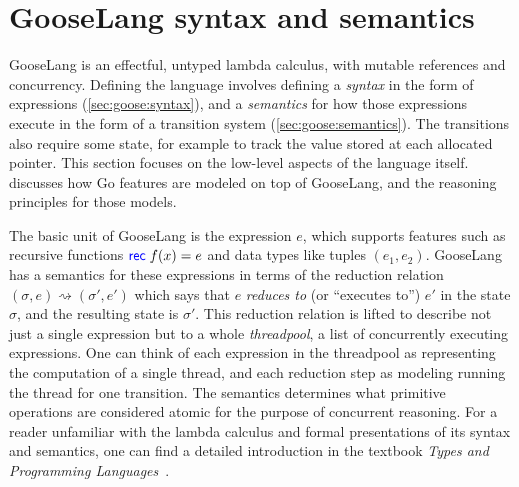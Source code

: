 \section{GooseLang syntax and semantics}%
\label{sec:goose:lang}

\newcommand{\binop}{\circledcirc}
\newcommand{\unop}{\circleddash}

\newcommand{\external}{\mathsf{\textcolor{red}{\langle External \rangle}}}

\newcommand{\recfx}{\mbox{\goosekw{rec}\;$f(x) = e$}}
\newcommand{\gooselambda}[1]{\goosekw{\lambda}#1.\,}

\newcommand{\reduces}{\rightsquigarrow}
\newcommand{\purereduction}{\overset{\mathrm{pure}}{\reduces}}

\newcommand{\nareading}[2]{\mathsf{reading}(#1, #2)}
\newcommand{\nawriting}[1]{\mathsf{writing}(#1)}

GooseLang is an effectful, untyped lambda calculus, with mutable references and
concurrency. Defining the language involves defining a \emph{syntax} in the form
of expressions (\cref{sec:goose:syntax}), and a \emph{semantics} for how those expressions execute in the
form of a transition system (\cref{sec:goose:semantics}). The transitions also require some state, for
example to track the value stored at each allocated pointer. This section
focuses on the low-level aspects of the language itself.
 discusses how Go features are modeled on top of
GooseLang, and the reasoning principles for those models.

The basic unit of GooseLang is the expression $e$, which supports features such as recursive
functions $\recfx$ and data types like tuples $(e_1, e_2)$. GooseLang has
a semantics for these expressions in terms of the reduction relation
$(\sigma, e) \reduces (\sigma', e')$ which says that $e$ \emph{reduces to} (or ``executes
to'') $e'$ in the state $\sigma$, and the resulting state is $\sigma'$. This
reduction relation is lifted to describe not just a single expression but to a
whole \emph{threadpool}, a list of concurrently executing expressions. One
can think of each expression in the threadpool as representing the computation of a single thread,
and each reduction step as modeling running the thread for one transition. The
semantics determines what primitive operations are considered atomic for the
purpose of concurrent reasoning. For a reader unfamiliar with the lambda
calculus and formal presentations of its syntax and semantics, one can find
a detailed introduction in the textbook \emph{Types and Programming
Languages}~\cite[Chapter~5]{pierce:tapl}.


